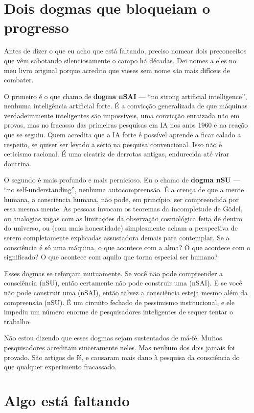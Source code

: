 \documentclass[11pt, twoside, openright]{book}
\begin{document}
\section*{Dois dogmas que bloqueiam o progresso}

Antes de dizer o que eu acho que está faltando, preciso nomear dois preconceitos que vêm sabotando silenciosamente o campo há décadas. Dei nomes a eles no meu livro original porque acredito que vieses sem nome são mais difíceis de combater.

O primeiro é o que chamo de \textbf{dogma nSAI} --- ``no strong artificial intelligence'', nenhuma inteligência artificial forte. É a convicção generalizada de que máquinas verdadeiramente inteligentes são impossíveis, uma convicção enraizada não em provas, mas no fracasso das primeiras pesquisas em IA nos anos 1960 e na reação que se seguiu. Quem acredita que a IA forte é possível aprende a ficar calado a respeito, se quiser ser levado a sério na pesquisa convencional. Isso não é ceticismo racional. É uma cicatriz de derrotas antigas, endurecida até virar doutrina.

O segundo é mais profundo e mais pernicioso. Eu o chamo de \textbf{dogma nSU} --- ``no self-understanding'', nenhuma autocompreensão. É a crença de que a mente humana, a consciência humana, não pode, em princípio, ser compreendida por essa mesma mente. As pessoas invocam os teoremas da incompletude de Gödel, ou analogias vagas com as limitações da observação cosmológica feita de dentro do universo, ou (com mais honestidade) simplesmente acham a perspectiva de serem completamente explicadas assustadora demais para contemplar. Se a consciência é só uma máquina, o que acontece com a alma? O que acontece com o significado? O que acontece com aquilo que torna especial ser humano?

Esses dogmas se reforçam mutuamente. Se você não pode compreender a consciência (nSU), então certamente não pode construir uma (nSAI). E se você não pode construir uma (nSAI), então talvez a consciência esteja mesmo além da compreensão (nSU). É um circuito fechado de pessimismo institucional, e ele impediu um número enorme de pesquisadores inteligentes de sequer tentar o trabalho.

Não estou dizendo que esses dogmas sejam sustentados de má-fé. Muitos pesquisadores acreditam sinceramente neles. Mas nenhum dos dois jamais foi provado. São artigos de fé, e causaram mais dano à pesquisa da consciência do que qualquer experimento fracassado.

\section*{Algo está faltando}
\end{document}

